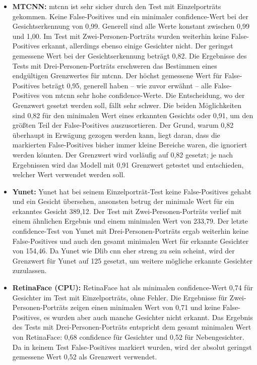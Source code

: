 \begin{itemize}
%	
	\item \textbf{MTCNN:} \gls{mtcnn} ist sehr sicher durch den Test mit Einzelporträts gekommen. Keine False-Positives und ein minimaler \gls{confidence}-Wert bei der Gesichtserkennung von 0{,}99. Generell sind alle Werte konstant zwischen 0{,}99 und 1{,}00.  
Im Test mit Zwei-Personen-Porträts wurden weiterhin keine False-Positives erkannt, allerdings ebenso einige Gesichter nicht. Der geringst gemessene Wert bei der Gesichtserkennung beträgt 0{,}82. Die Ergebnisse des Tests mit Drei-Personen-Porträts erschweren das Bestimmen eines endgültigen Grenzwertes für \gls{mtcnn}. Der höchst gemessene Wert für False-Positives beträgt 0{,}95, generell haben – wie zuvor erwähnt – alle False-Positives von \gls{mtcnn} sehr hohe \gls{confidence}-Werte. Die Entscheidung, wo der Grenzwert gesetzt werden soll, fällt sehr schwer. Die beiden Möglichkeiten sind 0{,}82 für den minimalen Wert eines erkannten Gesichts oder 0{,}91, um den größten Teil der False-Positives auszusortieren. Der Grund, warum 0{,}82 überhaupt in Erwägung gezogen werden kann, liegt daran, dass die markierten False-Positives bisher immer kleine Bereiche waren, die ignoriert werden könnten. Der Grenzwert wird vorläufig auf 0{,}82 gesetzt; je nach Ergebnissen wird das Modell mit 0{,}91 Grenzwert getestet und entschieden, welcher Wert verwendet werden soll.
%	
	\item \textbf{Yunet:} Yunet hat bei seinem Einzelporträt-Test keine False-Positives gehabt und ein Gesicht übersehen, ansonsten betrug der minimale Wert für ein erkanntes Gesicht 389{,}12. Der Test mit Zwei-Personen-Porträts verlief mit einem ähnlichen Ergebnis und einem minimalen Wert von 233{,}79. Der letzte \gls{confidence}-Test von Yunet mit Drei-Personen-Porträts ergab weiterhin keine False-Positives und auch den gesamt minimalen Wert für erkannte Gesichter von 154{,}46. Da Yunet wie Dlib \gls{cnn} eher streng zu sein scheint, wird der Grenzwert für Yunet auf 125 gesetzt, um weitere mögliche erkannte Gesichter zuzulassen.
%	
	\item \textbf{RetinaFace (CPU):} RetinaFace hat als minimalen \gls{confidence}-Wert 0{,}74 für Gesichter im Test mit Einzelporträts, ohne Fehler. Die Ergebnisse für Zwei-Personen-Porträts zeigen einen minimalen Wert von 0{,}71 und keine False-Positives, es wurden aber auch manche Gesichter nicht erkannt. Das Ergebnis des Tests mit Drei-Personen-Porträts entspricht dem gesamt minimalen Wert von RetinaFace: 0{,}68 \gls{confidence} für Gesichter und 0{,}52 für Nebengesichter. Da in keinem Test False-Positives markiert wurden, wird der absolut geringst gemessene Wert 0{,}52 als Grenzwert verwendet.
\end{itemize}

